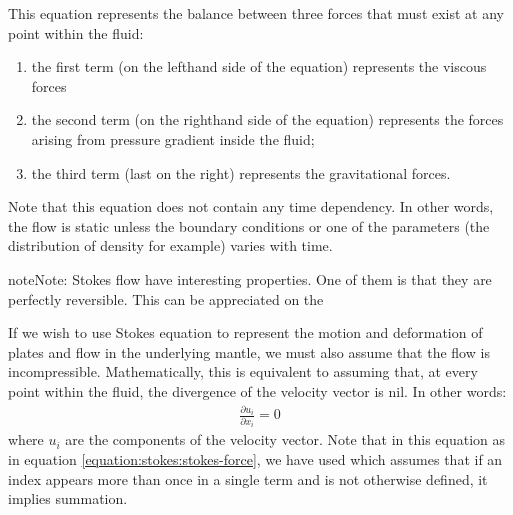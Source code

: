 \documentclass[letterpaper,10pt,english]{jupyterBook}
\begin{document}
\sphinxAtStartPar
This equation represents the balance between three forces that must exist at any point within the fluid:
\begin{enumerate}
%
\item {} 
\sphinxAtStartPar
the first term (on the left\sphinxhyphen{}hand side of the equation) represents the viscous forces

\item {} 
\sphinxAtStartPar
the second term (on the right\sphinxhyphen{}hand side of the equation) represents the forces arising from pressure gradient inside the fluid;

\item {} 
\sphinxAtStartPar
the third term (last on the right) represents the gravitational forces.

\end{enumerate}

\sphinxAtStartPar
Note that this equation does not contain any time dependency. In other words, the flow is static unless the boundary conditions or one of the parameters (the distribution of density for example) varies with time.

\begin{sphinxadmonition}{note}{Note:}
\sphinxAtStartPar
Stokes flow have interesting properties. One of them is that they are perfectly reversible. This can be appreciated on the 
\end{sphinxadmonition}

\sphinxAtStartPar
If we wish to use Stokes equation to represent the motion and deformation of plates and flow in the underlying mantle, we must also assume that the flow is incompressible. Mathematically, this is equivalent to assuming that, at every point within the fluid, the divergence of the velocity vector is nil. In other words:
\begin{equation}\label{equation:stokes:incompressibility}
\begin{split}\frac{\partial u_i}{\partial x_i}=0\end{split}
\end{equation}
\sphinxAtStartPar
where \(u_i\) are the components of the velocity vector. Note that in this equation as in equation \eqref{equation:stokes:stokes-force}, we have used  which assumes that if an index appears more than once in a single term and is not otherwise defined, it implies summation.
\end{document}
